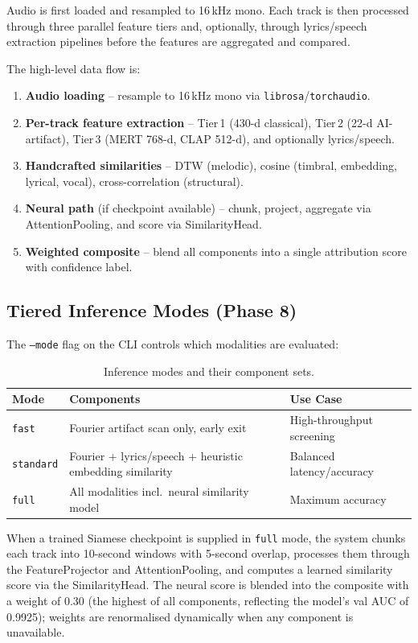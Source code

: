\documentclass[11pt,a4paper]{article}
\begin{document}
Audio is first loaded and resampled to 16\,kHz mono. Each track is then processed through three parallel feature tiers and, optionally, through lyrics/speech extraction pipelines before the features are aggregated and compared.

The high-level data flow is:
\begin{enumerate}[nosep]
  \item \textbf{Audio loading} -- resample to 16\,kHz mono via \texttt{librosa}/\texttt{torchaudio}.
  \item \textbf{Per-track feature extraction} -- Tier\,1 (430-d classical), Tier\,2 (22-d AI-artifact), Tier\,3 (MERT 768-d, CLAP 512-d), and optionally lyrics/speech.
  \item \textbf{Handcrafted similarities} -- DTW (melodic), cosine (timbral, embedding, lyrical, vocal), cross-correlation (structural).
  \item \textbf{Neural path} (if checkpoint available) -- chunk, project, aggregate via AttentionPooling, and score via SimilarityHead.
  \item \textbf{Weighted composite} -- blend all components into a single attribution score with confidence label.
\end{enumerate}

\subsection{Tiered Inference Modes (Phase 8)}

The \texttt{--mode} flag on the CLI controls which modalities are evaluated:

\begin{table}[H]
\centering
\begin{tabular}{lll}
\toprule
\textbf{Mode} & \textbf{Components} & \textbf{Use Case} \\
\midrule
\texttt{fast} & Fourier artifact scan only, early exit & High-throughput screening \\
\texttt{standard} & Fourier + lyrics/speech + heuristic embedding similarity & Balanced latency/accuracy \\
\texttt{full} & All modalities incl.\ neural similarity model & Maximum accuracy \\
\bottomrule
\end{tabular}
\caption{Inference modes and their component sets.}
\end{table}

When a trained Siamese checkpoint is supplied in \texttt{full} mode, the system chunks each track into 10-second windows with 5-second overlap, processes them through the FeatureProjector and AttentionPooling, and computes a learned similarity score via the SimilarityHead. The neural score is blended into the composite with a weight of 0.30 (the highest of all components, reflecting the model's val AUC of 0.9925); weights are renormalised dynamically when any component is unavailable.
\end{document}
